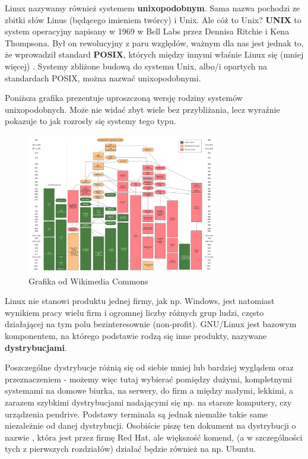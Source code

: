 \documentclass[12pt]{article}
\begin{document}
Linux nazywamy również systemem \textbf{unixopodobnym}. Sama nazwa pochodzi ze zbitki słów Linus (będącego imieniem twórcy) i Unix. Ale cóż to Unix? \textbf{UNIX} to system operacyjny napisany w 1969 w Bell Labs przez Dennisa Ritchie i Kena Thompsona. Był on rewolucyjny z paru względów, ważnym dla nas jest jednak to, że wprowadził standard \textbf{POSIX}, których między innymi właśnie Linux się (mniej więcej) . Systemy zbliżone budową do systemu Unix, albo/i opartych na standardach POSIX, można nazwać unixopodobnymi.

Poniższa grafika prezentuje uproszczoną wersję rodziny systemów unixopodobnych. Może nie widać zbyt wiele bez przybliżania, lecz wyraźnie pokazuje to jak rozrosły się systemy tego typu.

\begin{figure}[H]
    \centering
    \includegraphics[width=0.75\textwidth]{Unix_history-simple.svg.png}
    \caption{Grafika od Wikimedia Commons}
\end{figure}

Linux nie stanowi produktu jednej firmy, jak np. Windows, jest natomiast wynikiem pracy wielu firm i ogromnej liczby różnych grup ludzi, często działającej na tym polu bezinteresownie (non-profit). GNU/Linux jest bazowym komponentem, na którego podstawie rodzą się inne produkty, nazywane \textbf{dystrybucjami}.

Poszczególne dystrybucje różnią się od siebie mniej lub bardziej wyglądem oraz przeznaczeniem - możemy więc tutaj wybierać pomiędzy dużymi, kompletnymi systemami na domowe biurka, na serwery, do firm a między małymi, lekkimi, a zarazem szybkimi dystrybucjami nadającymi się np. na starsze komputery, czy urządzenia pendrive. Podstawy terminala są jednak niemalże takie same niezależnie od danej dystrybucji. Osobiście piszę ten dokument na dystrybucji o nazwie , która  jest przez firmę Red Hat, ale większość komend, (a w szczególności tych z pierwszych rozdziałów) działać będzie również na np. Ubuntu.
\end{document}
